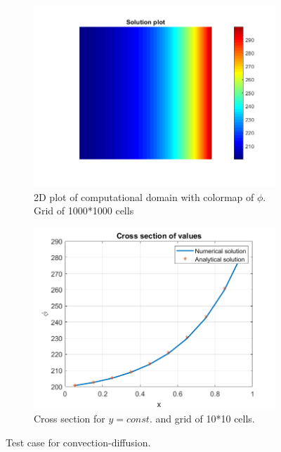 \documentclass[]{article}
\begin{document}
\begin{figure}
	\centering
	\begin{subfigure}{.49\textwidth}
		\centering
		\includegraphics[width=1\linewidth]{figs/convection_diffusion}
		\caption{2D plot of computational domain with colormap of $ \phi $. Grid of 1000*1000 cells}
		\label{fig:convectiondiffusion}
	\end{subfigure}
	\begin{subfigure}{.49\textwidth}
		\centering
		\includegraphics[width=1\linewidth]{figs/convection_diffusion_cross_10}
		\caption{Cross section for $y=const.$ and grid of 10*10 cells.}
		\label{fig:convectiondiffusioncross10}
	\end{subfigure}
	\caption{Test case for convection-diffusion.}
	\label{fig:convection_test_case}
\end{figure}
\end{document}
